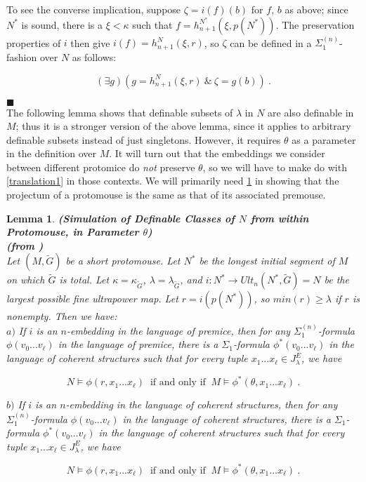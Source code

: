 \documentclass[12pt]{article}
\newtheorem{lem}[thm]{Lemma}
\begin{document}
To see the converse implication, suppose $\zeta = i (f)(b)$ for $f$, $b$ as above; since $N^*$ is sound, there is a $\xi < \kappa$ such that $f = h_{n+1}^{N^*} ( \xi , p (N^*))$.  The preservation properties of $i$ then give $i(f) = h_{n+1}^N ( \xi , r)$, so $\zeta$ can be defined in a $\Sigma_1^{(n)}$-fashion over $N$ as follows:

\[
(\exists g ) ( g = h_{n+1}^N (\xi , r ) \ \& \ \zeta = g (b)) \ .
\]

$\blacksquare$\\

The following lemma shows that definable subsets of $\lambda$ in $N$ are also definable in $M$; thus it is a stronger version of the above lemma, since it applies to arbitrary definable subsets instead of just singletons.  However, it requires $\theta$ as a parameter in the definition over $M$.  It will turn out that the embeddings we consider between different protomice do \textit{not} preserve $\theta$, so we will have to make do with \ref{translation1} in those contexts.  We will primarily need \ref{translation2} in showing that the projectum of a protomouse is the same as that of its associated premouse.\\


\begin{lem} \label{translation2}
\textbf{(Simulation of Definable Classes of $N$ from within Protomouse, in Parameter $\theta$)}\\
\textbf{(from \cite{zeman square proof})}\\
Let $(M , \tilde{G})$ be a short protomouse.  Let $N^*$ be the longest initial segment of $M$ on which $\tilde{G}$ is total.  Let $\kappa = \kappa_{\tilde{G}}$, $ \lambda = \lambda_{\tilde{G}}$, and $i: N^* \longrightarrow Ult_n (N^* , \tilde{G} ) = N$ be the largest possible fine ultrapower map.  Let $r =  i (p (N^* ))$, so $min(r) \geq \lambda$ if $r$ is nonempty.  Then we have:\\

\indent \indent $a)$ If $i$ is an $n$-embedding in the language of premice, then for any $\Sigma_1^{(n)}$-formula $\phi ( v_0 ... v_\ell )$ in the language of premice, there is a $\Sigma_1$-formula $\phi^* ( v_0 ... v_\ell )$ in the language of coherent structures such that for every tuple $x_1 ... x_\ell \in J_\lambda^E$, we have

\[
N \models \phi ( r , x_1 ... x_\ell ) \ \text{ if and only if } \ M \models \phi^* ( \theta , x_1 ... x_\ell ) \ .
\]

\indent \indent $b)$ If $i$ is an $n$-embedding in the language of coherent structures, then for any $\Sigma_1^{(n)}$-formula $\phi ( v_0 ... v_\ell )$ in the language of coherent structures, there is a $\Sigma_1$-formula $\phi^* ( v_0 ... v_\ell )$ in the language of coherent structures such that for every tuple $x_1 ... x_\ell \in J_\lambda^E$, we have

\[
N \models \phi ( r , x_1 ... x_\ell ) \ \text{ if and only if } \ M \models \phi^* ( \theta , x_1 ... x_\ell ) \ .
\]


\end{lem}
\end{document}

